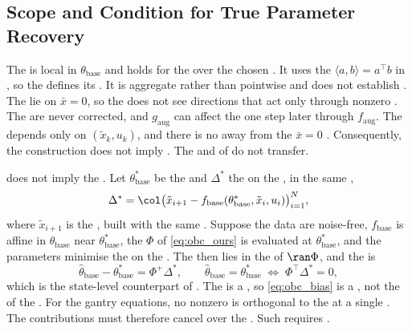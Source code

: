 \subsection{Scope and Condition for True Parameter Recovery}\label{sec:obc_scope}
The  is local in $\theta_{\mathrm{base}}$ and holds for the  over the chosen . It uses the 
$\langle a,b\rangle=a^\top b$ in , so the  defines its . It is aggregate rather than pointwise and
does not establish . The  lie on $\bar x=0$, so the
 does not see directions that act only through nonzero .
The  are never corrected, and $g_{\mathrm{aug}}$ can affect the
 one step later through $f_{\mathrm{aug}}$. The 
depends only on $(\tilde x_k,u_k)$, and there is no  away from
the $\bar x=0$ . Consequently, the construction does not imply
. The  and 
of \cite[Thms.~16, 18]{gyorok2026obc} do not transfer.

 does not imply the .
Let $\theta^*_{\mathrm{base}}$ be the  and $\Delta^*$ the  on the , in the same ,
\begin{equation}
 \Delta^*=\col\bigl(\tilde x_{i+1}-f_{\mathrm{base}}(\theta^*_{\mathrm{base}},
 \tilde x_i,u_i)\bigr)_{i=1}^{N},
\label{eq:obc_delta}
\end{equation}
where $\tilde x_{i+1}$ is the , built with the same .
Suppose the data are noise-free, $f_{\mathrm{base}}$ is affine in
$\theta_{\mathrm{base}}$ near $\theta^*_{\mathrm{base}}$, the  $\Phi$ of
\eqref{eq:obc_ours} is evaluated at $\theta^*_{\mathrm{base}}$, and the
parameters minimise the  on the .
The  then lies in the  of
$\ran\Phi$, and the  is
\begin{equation}
 \hat\theta_{\mathrm{base}}-\theta^*_{\mathrm{base}}=\Phi^{+}\Delta^*,
 \qquad
 \hat\theta_{\mathrm{base}}=\theta^*_{\mathrm{base}}
 \;\Longleftrightarrow\;
 \Phi^\top\Delta^*=0,
\label{eq:obc_bias}
\end{equation}
which is the state-level counterpart of \cite[Cond.~4, Eq.~(21)]{gyorok2026obc}.
The  is a , so
\eqref{eq:obc_bias} is a , not the  of the .
For the gantry equations, no nonzero  is orthogonal to
the  at a single . The contributions must therefore cancel
over the . Such  requires  \cite[Remark~5]{gyorok2026obc}.


